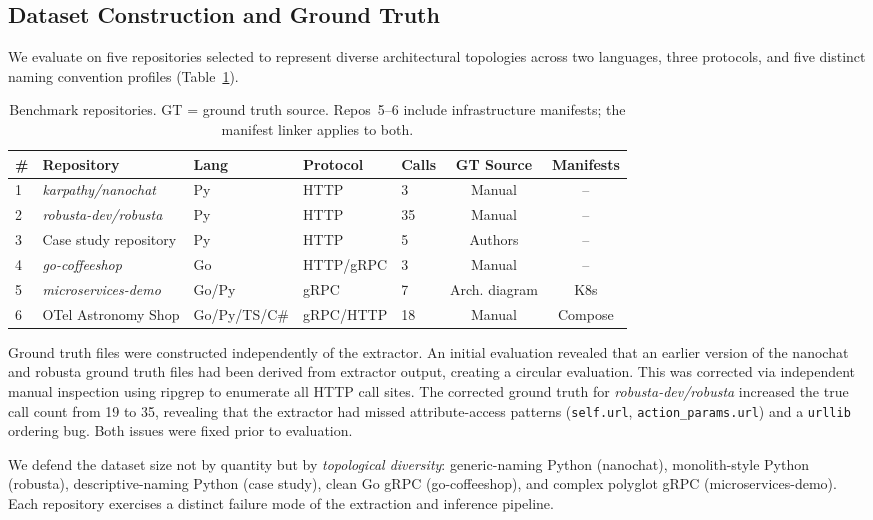 \documentclass[runningheads]{llncs}
\begin{document}
\subsection{Dataset Construction and Ground Truth}
\label{sec:gt}

We evaluate on five repositories selected to represent diverse architectural
topologies across two languages, three protocols, and five distinct naming
convention profiles (Table~\ref{tab:repos}).

\begin{table}[t]
\caption{Benchmark repositories. GT = ground truth source. Repos~5--6
  include infrastructure manifests; the manifest linker applies to both.}
\label{tab:repos}
\centering
\small
\begin{tabular}{lllllcc}
\toprule
\# & Repository & Lang & Protocol & Calls & GT Source & Manifests \\
\midrule
1 & \emph{karpathy/nanochat}      & Py         & HTTP      & 3  & Manual        & -- \\
2 & \emph{robusta-dev/robusta}    & Py         & HTTP      & 35 & Manual        & -- \\
3 & Case study repository         & Py         & HTTP      & 5  & Authors       & -- \\
4 & \emph{go-coffeeshop}          & Go         & HTTP/gRPC & 3  & Manual        & -- \\
5 & \emph{microservices-demo}     & Go/Py      & gRPC      & 7  & Arch. diagram & K8s \\
6 & OTel Astronomy Shop           & Go/Py/TS/C\# & gRPC/HTTP & 18 & Manual      & Compose \\
\bottomrule
\end{tabular}
\end{table}

Ground truth files were constructed independently of the extractor.
An initial evaluation revealed that an earlier version of the nanochat and
robusta ground truth files had been derived from extractor output, creating
a circular evaluation. This was corrected via independent manual inspection
using ripgrep to enumerate all HTTP call sites. The corrected ground truth
for \emph{robusta-dev/robusta} increased the true call count from 19 to 35,
revealing that the extractor had missed attribute-access patterns
(\texttt{self.url}, \texttt{action\_params.url}) and a \texttt{urllib}
ordering bug. Both issues were fixed prior to evaluation.

We defend the dataset size not by quantity but by \emph{topological
diversity}: generic-naming Python (nanochat), monolith-style Python
(robusta), descriptive-naming Python (case study), clean Go gRPC
(go-coffeeshop), and complex polyglot gRPC (microservices-demo). Each
repository exercises a distinct failure mode of the extraction and inference
pipeline.
\end{document}

